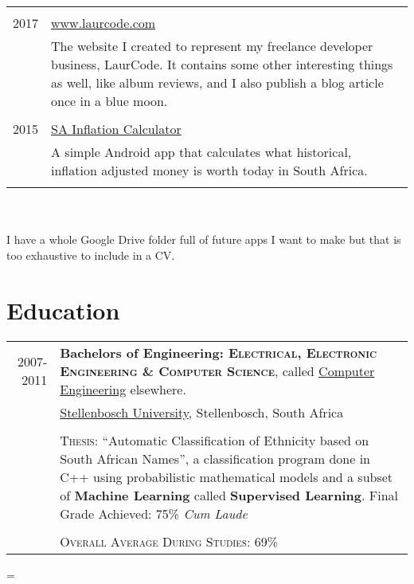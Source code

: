 \documentclass[a4paper,10pt,notitlepage]{article}
\newenvironment{absolutelynopagebreak}
  {\par\nobreak\vfil\penalty0\vfilneg
   \vtop\bgroup}
  {\par\xdef\tpd{\the\prevdepth}\egroup
   \prevdepth=\tpd}
\begin{document}
\begin{absolutelynopagebreak}
\begin{tabular}{r|p{11cm}}
{		\multicolumn{2}{c}{} \\
		
		\textsc{2017} &                                                                                                                  
		\href{www.laurcode.com}{www.laurcode.com}\\&\footnotesize{The website I created to represent my freelance developer business, LaurCode. It contains some other interesting things as well, like album reviews, and I also publish a blog article once in a blue moon. } \\
		
		\multicolumn{2}{c}{} \\
		\textsc{2015} &                                                                                                                  
		\href{https://play.google.com/store/apps/details?id=za.co.inflationcalc}{SA Inflation Calculator}\\&\footnotesize{A simple Android app that calculates what historical, inflation adjusted money is worth today in South Africa. } \\
		
		\multicolumn{2}{c}{} \\
		
	\end{tabular}
	
	\\\\
	
    \footnotesize{I have a whole Google Drive folder full of future apps I want to make but that is too exhaustive to include in a CV}.
	
	\section{Education}
	\begin{tabular}{r|p{11cm}}
		
		\textsc{2007-2011} & \textbf{Bachelors of Engineering: \textsc{Electrical, Electronic Engineering \& Computer Science}}, called \href{https://en.wikipedia.org/wiki/Computer_engineering}{Computer Engineering} elsewhere. \\
		& \href{https://en.wikipedia.org/wiki/Stellenbosch_University}{Stellenbosch University}, Stellenbosch, South Africa \\
		
		\multicolumn{2}{c}{}\\
		
		& \textsc{Thesis}: ``Automatic Classification of Ethnicity based on South African Names'', a classification program done in C++ using probabilistic mathematical models and a subset of \textbf{Machine Learning} called \textbf{Supervised Learning}. \small Final Grade Achieved: 75\% \textit{Cum Laude} \\ \\
		&\normalsize \textsc{Overall Average During Studies}: 69\% \\
		

\end{tabular}
\end{absolutelynopagebreak}
\end{document}
